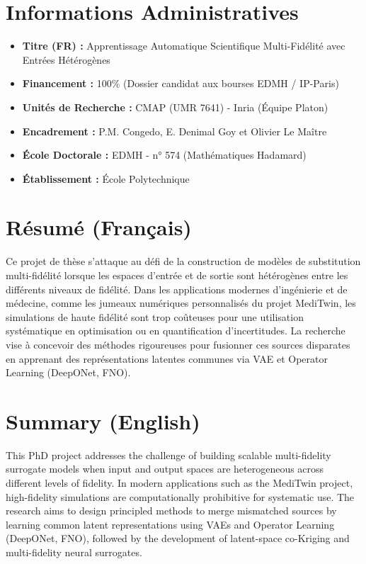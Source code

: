 \documentclass[a4paper,11pt]{article}
\begin{document}
\section*{Informations Administratives}
\begin{itemize}[label=--]
    \item \textbf{Titre (FR) :} Apprentissage Automatique Scientifique Multi-Fidélité avec Entrées Hétérogènes
    \item \textbf{Financement :} 100\% (Dossier candidat aux bourses EDMH / IP-Paris)
    \item \textbf{Unités de Recherche :} CMAP (UMR 7641) - Inria (Équipe Platon)
    \item \textbf{Encadrement :} P.M. Congedo, E. Denimal Goy et Olivier Le Maître
    \item \textbf{École Doctorale :} EDMH - n° 574 (Mathématiques Hadamard)
    \item \textbf{Établissement :} École Polytechnique
\end{itemize}

\section*{Résumé (Français)}
Ce projet de thèse s'attaque au défi de la construction de modèles de substitution multi-fidélité lorsque les espaces d'entrée et de sortie sont hétérogènes entre les différents niveaux de fidélité. Dans les applications modernes d'ingénierie et de médecine, comme les jumeaux numériques personnalisés du projet MediTwin, les simulations de haute fidélité sont trop coûteuses pour une utilisation systématique en optimisation ou en quantification d'incertitudes. La recherche vise à concevoir des méthodes rigoureuses pour fusionner ces sources disparates en apprenant des représentations latentes communes via VAE et Operator Learning (DeepONet, FNO).

\section*{Summary (English)}
This PhD project addresses the challenge of building scalable multi-fidelity surrogate models when input and output spaces are heterogeneous across different levels of fidelity. In modern applications such as the MediTwin project, high-fidelity simulations are computationally prohibitive for systematic use. The research aims to design principled methods to merge mismatched sources by learning common latent representations using VAEs and Operator Learning (DeepONet, FNO), followed by the development of latent-space co-Kriging and multi-fidelity neural surrogates.
\end{document}
